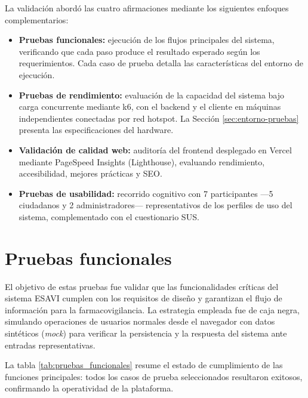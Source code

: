 La validación abordó las cuatro afirmaciones mediante los siguientes enfoques complementarios:

\begin{itemize}
    \item \textbf{Pruebas funcionales:} ejecución de los flujos principales del sistema, verificando que cada paso produce el resultado esperado según los requerimientos. Cada caso de prueba detalla las características del entorno de ejecución.
\item \textbf{Pruebas de rendimiento:} evaluación de la capacidad del sistema bajo carga concurrente mediante k6, con el backend y el cliente en máquinas independientes conectadas por red hotspot. La Sección \ref{sec:entorno-pruebas} presenta las especificaciones del hardware.
    \item \textbf{Validación de calidad web:} auditoría del frontend desplegado en Vercel mediante PageSpeed Insights (Lighthouse), evaluando rendimiento, accesibilidad, mejores prácticas y SEO.
    \item \textbf{Pruebas de usabilidad:} recorrido cognitivo con 7 participantes —5 ciudadanos y 2 administradores— representativos de los perfiles de uso del sistema, complementado con el cuestionario SUS.
\end{itemize}



\section{Pruebas funcionales}


El objetivo de estas pruebas fue validar que las funcionalidades críticas del sistema ESAVI cumplen con los requisitos de diseño y garantizan el flujo de información para la farmacovigilancia. 
La estrategia empleada fue de caja negra, simulando operaciones de usuarios normales desde el navegador con datos sintéticos (\textit{mock}) para verificar la persistencia y la respuesta del sistema ante entradas representativas. 

La tabla \ref{tab:pruebas_funcionales} resume el estado de cumplimiento de las funciones principales: todos los casos de prueba seleccionados resultaron exitosos, confirmando la operatividad de la plataforma.


